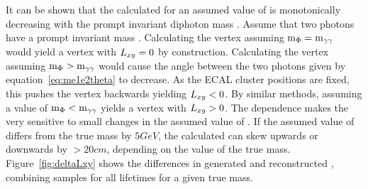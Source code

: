 It can be shown that the calculated \lxy for an assumed value of \mphi is monotonically decreasing with the prompt invariant diphoton mass \mgg. Assume that two photons have a prompt invariant mass \mgg. Calculating the vertex assuming $\text{m}_\Phi=\text{m}_{\gamma\gamma}$ would yield a vertex with $L_{xy}=0$ by construction. Calculating the vertex assuming $\text{m}_\Phi>\text{m}_{\gamma\gamma}$ would cause the angle between the two photons given by equation~\ref{eq:me1e2theta} to decrease. As the ECAL cluster positions are fixed, this pushes the vertex backwards yielding $L_{xy}<0$. By similar methods, assuming a value of $\text{m}_\Phi<\text{m}_{\gamma\gamma}$ yields a vertex with $L_{xy}>0$. The dependence makes the \lxy very sensitive to small changes in the assumed value of \mphi. If the assumed value of \mphi differs from the true mass by $5\unit{GeV}$, the calculated \lxy can skew upwards or downwards by $>20\unit{cm}$, depending on the value of the true mass. Figure~\ref{fig:deltaLxy} shows the differences in generated and reconstructed \lxy, combining samples for all lifetimes for a given true mass.

